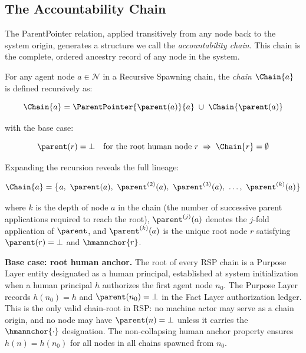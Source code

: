 \subsection{The Accountability Chain}

The ParentPointer relation, applied transitively from any node back to the system origin, generates a structure we call the \textit{accountability chain}. This chain is the complete, ordered ancestry record of any node in the system.

\begin{dfn}
\label{def:chain}
For any agent node $a \in \mathcal{N}$ in a Recursive Spawning chain, the \emph{chain} $\Chain{a}$ is defined recursively as:

\begin{equation}
\Chain{a} = \ParentPointer{\parent(a)}{a} \;\cup\; \Chain{\parent(a)}
\label{eq:chain-recursive}
\end{equation}

\noindent with the base case:

\begin{equation}
\parent(r) = \bot \quad\text{for the root human node } r \;\Rightarrow\; \Chain{r} = \emptyset
\label{eq:chain-base}
\end{equation}
\end{dfn}

Expanding the recursion reveals the full lineage:

\begin{equation}
\Chain{a} = \bigl\{ a,\ \parent(a),\ \parent^{(2)}(a),\ \parent^{(3)}(a),\ \ldots,\ \parent^{(k)}(a) \bigr\}
\label{eq:chain-expanded}
\end{equation}

where $k$ is the depth of node $a$ in the chain (the number of successive parent applications required to reach the root), $\parent^{(j)}(a)$ denotes the $j$-fold application of $\parent$, and $\parent^{(k)}(a)$ is the unique root node $r$ satisfying $\parent(r) = \bot$ and $\hmannchor{r}$.

\bigskip
\noindent\textbf{Base case: root human anchor.} The root of every RSP chain is a Purpose Layer entity designated as a human principal, established at system initialization when a human principal $h$ authorizes the first agent node $n_0$. The Purpose Layer records $h(n_0) = h$ and $\parent(n_0) = \bot$ in the Fact Layer authorization ledger. This is the only valid chain-root in RSP: no machine actor may serve as a chain origin, and no node may have $\parent(n) = \bot$ unless it carries the $\hmannchor{\cdot}$ designation. The non-collapsing human anchor property ensures $h(n) = h(n_0)$ for all nodes in all chains spawned from $n_0$.

